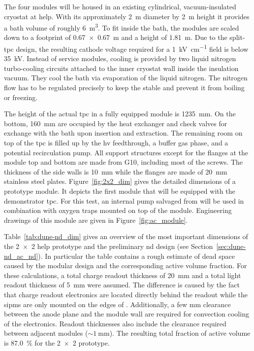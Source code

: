 The four modules will be housed in an existing cylindrical, vacuum-insulated cryostat at \gls{help}.
With its approximately \SI{2}{\metre} diameter by \SI{2}{\metre} height it provides a \lar{} bath volume of roughly \SI{6}{\metre\cubed}.
To fit inside the bath, the modules are scaled down to a footprint of \SI{0.67 x 0.67}{\metre} and a height of \SI{1.81}{\metre}.
Due to the split-\gls{tpc} design, the resulting cathode voltage required for a \SI{1}{\kilo\volt\per\centi\metre} field is below \SI{35}{\kilo\volt}.
Instead of service modules, cooling is provided by two liquid nitrogen turbo-cooling circuits attached to the inner cryostat wall inside the insulation vacuum.
They cool the \lar{} bath via evaporation of the liquid nitrogen.
The nitrogen flow has to be regulated precisely to keep the \lar{} stable and prevent it from boiling or freezing.

The height of the actual \gls{tpc} in a fully equipped module is \SI{1235}{\milli\metre}.
On the bottom, \SI{160}{\milli\metre} are occupied by the heat exchanger and check valves for \lar{} exchange with the bath upon insertion and extraction.
The remaining room on top of the \gls{tpc} is filled up by the \gls{hv} feedthrough, a buffer gas phase, and a potential recirculation pump.
All support structures except for the flanges at the module top and bottom are made from G10, including most of the screws.
The thickness of the side walls is \SI{10}{\milli\metre} while the flanges are made of \SI{20}{\milli\metre} stainless steel plates.
Figure~\ref{fig:2x2_dim} gives the detailed dimensions of a prototype module.
It depicts the first module that will be equipped with the demonstrator \gls{tpc}.
For this test, an internal pump salvaged from \AT{} will be used in combination with oxygen traps mounted on top of the module.
Engineering drawings of this module are given in Figure~\ref{fig:ac_module}.

Table~\ref{tab:dune-nd_dim} gives an overview of the most important dimensions of the \num{2 x 2} \gls{help} prototype and the preliminary \gls{nd} design (see Section~\ref{sec:dune-nd_ac_nd}).
In particular the table contains a rough estimate of dead space caused by the modular design and the corresponding active volume fraction.
For these calculations, a total charge readout thickness of \SI{20}{\milli\metre} and a total light readout thickness of \SI{5}{\milli\metre} were assumed.
The difference is caused by the fact that charge readout electronics are located directly behind the readout while the \glspl{sipm} are only mounted on the edges of \AL{}.
Additionally, a few \si{\milli\metre} clearance between the anode plane and the module wall are required for convection cooling of the \pixlar{} electronics.
Readout thicknesses also include the clearance required between adjacent modules ($\sim{\SI{1}{\milli\metre}}$).
The resulting total fraction of active volume is \SI{87.0}{\percent} for the \num{2 x 2} prototype.

